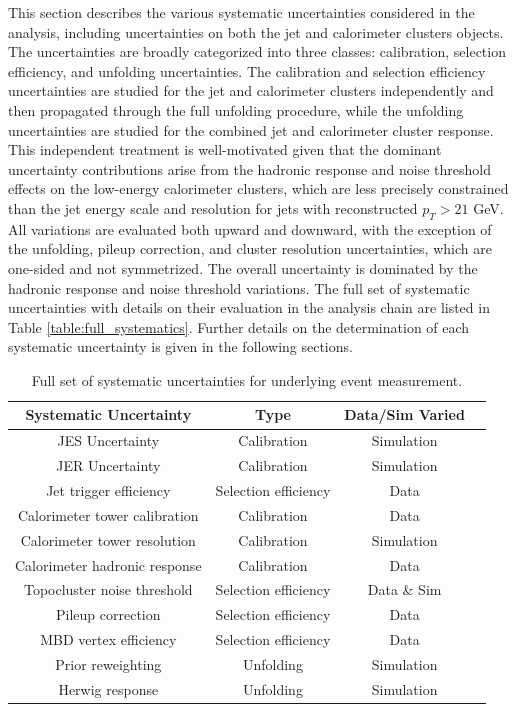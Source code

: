 This section describes the various systematic uncertainties considered in the analysis, including uncertainties on both the jet and calorimeter clusters objects.
The uncertainties are broadly categorized into three classes: calibration, selection efficiency, and unfolding uncertainties. 
The calibration and selection efficiency uncertainties are studied for the jet and calorimeter clusters independently and then propagated through the full unfolding procedure, while the unfolding uncertainties are studied for the combined jet and calorimeter cluster response. 
This independent treatment is well-motivated given that the dominant uncertainty contributions arise from the hadronic response and noise threshold effects on the low-energy calorimeter clusters, which are less precisely constrained than the jet energy scale and resolution for jets with reconstructed $p_{T} > 21$ GeV.
All variations are evaluated both upward and downward, with the exception of the unfolding, pileup correction, and cluster resolution uncertainties, which are one-sided and not symmetrized. The overall uncertainty is dominated by the hadronic response and noise threshold variations.
The full set of systematic uncertainties with details on their evaluation in the analysis chain are listed in Table \ref{table:full_systematics}. 
Further details on the determination of each systematic uncertainty is given in the following sections. \newline
\begin{table}[ht]
\centering
\begin{tabular}{|c|c|c|c|}
\hline
Systematic Uncertainty & Type & Data/Sim Varied \\ \hline
JES Uncertainty & Calibration & Simulation \\ \hline
JER Uncertainty & Calibration & Simulation \\ \hline
Jet trigger efficiency & Selection efficiency & Data \\ \hline
Calorimeter tower calibration & Calibration & Data \\ \hline
Calorimeter tower resolution & Calibration & Simulation \\ \hline
Calorimeter hadronic response & Calibration & Data \\ \hline
Topocluster noise threshold & Selection efficiency & Data \& Sim \\ \hline
Pileup correction & Selection efficiency & Data \\ \hline
MBD vertex efficiency & Selection efficiency & Data \\ \hline
Prior reweighting & Unfolding & Simulation \\ \hline
Herwig response & Unfolding & Simulation \\ \hline
\end{tabular}
\caption{Full set of systematic uncertainties for underlying event measurement.}
\end{table}
\label{table:full_systematics}

